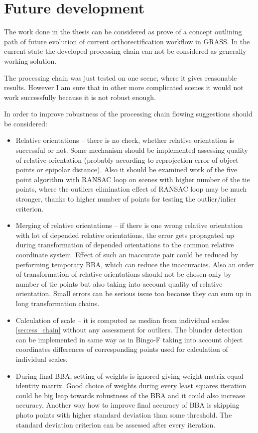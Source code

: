 \documentclass[a4paper,12pt]{article}
\begin{document}
\section{Future development}

The work done in the thesis can be considered as prove of a concept
outlining path of future evolution of current orthorectification workflow in GRASS. 
In the current state the developed 
processing chain can not be considered as generally working solution.

The processing chain was just tested 
 on one scene, where it gives reasonable results. However 
I am sure that in other more complicated scenes it would not work successfully because 
it is not robust enough.

In order to improve robustness of the processing chain flowing suggestions should be considered:
\begin{itemize}
\item Relative orientations -- there is no check, whether relative orientation is successful or not. Some mechanism 
should be implemented assessing quality of relative orientation (probably according to reprojection error of object points or 
epipolar distance).
Also it should be examined work of the five point algorithm with RANSAC loop on scenes with higher number of the tie points, where 
the outliers elimination effect of RANSAC loop may be much stronger, thanks to higher number of points for testing the
outlier/inlier criterion.
\item  Merging of relative orientations -- if there is one wrong relative orientation with lot of depended relative orientations,
the error gets propagated up during transformation of depended orientations to the common relative coordinate system. 
Effect of such an inaccurate pair could be 
reduced by performing  temporary BBA, which can reduce the inaccuracies. Also an order of transformation of relative orientations 
 should not 
be chosen only by number of tie points but also taking into account quality of relative orientation.
Small errors can be serious issue too because they can
sum up in long transformation chains. 
\item Calculation of scale -- it is computed as median from individual scales \ref{sec:ess_chain}
without any assessment for outliers. The blunder detection can be implemented in same way 
as in Bingo-F taking into account object coordinates differences of corresponding points used 
for calculation of individual scales.
\item During final BBA, setting of weights is ignored giving weight matrix equal identity matrix. 
Good choice of weights during every least squares iteration 
could be big leap towards robustness of the BBA and it could also increase accuracy. 
Another way how to improve final accuracy of BBA is skipping photo points with
higher standard deviation than some threshold. The standard deviation criterion can be assessed 
after every iteration.
\end{itemize}
\end{document}
